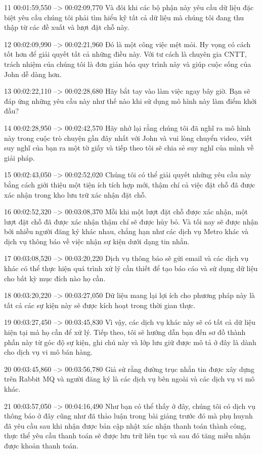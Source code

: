 11
00:01:59,550 --> 00:02:09,770
Và đôi khi các bộ phận này yêu cầu dữ liệu đặc biệt yêu cầu chúng tôi phải tìm hiểu kỹ tất cả dữ liệu mà chúng tôi đang thu thập từ các đề xuất và lượt đặt chỗ này.

12
00:02:09,990 --> 00:02:21,960
Đó là một công việc mệt mỏi.  Hy vọng có cách tốt hơn để giải quyết tất cả những điều này.  Với tư cách là chuyên gia CNTT, trách nhiệm của chúng tôi là đơn giản hóa quy trình này và giúp cuộc sống của John dễ dàng hơn.

13
00:02:22,110 --> 00:02:28,680
Hãy bắt tay vào làm việc ngay bây giờ.  Bạn sẽ đáp ứng những yêu cầu này như thế nào khi sử dụng mô hình này làm điểm khởi đầu?

14
00:02:28,950 --> 00:02:42,570
Hãy nhớ lại rằng chúng tôi đã nghĩ ra mô hình này trong cuộc trò chuyện gần đây nhất với John và vui lòng chuyển video, viết suy nghĩ của bạn ra một tờ giấy và tiếp theo tôi sẽ chia sẻ suy nghĩ của mình về giải pháp.

15
00:02:43,050 --> 00:02:52,020
Chúng tôi có thể giải quyết những yêu cầu này bằng cách giới thiệu một tiện ích tích hợp mới, thậm chí cả việc đặt chỗ đã được xác nhận trong kho lưu trữ xác nhận đặt chỗ.

16
00:02:52,320 --> 00:03:08,370
Mỗi khi một lượt đặt chỗ được xác nhận, một lượt đặt chỗ đã được xác nhận thậm chí sẽ được hủy bỏ.  Và tối nay sẽ được nhận bởi nhiều người đăng ký khác nhau, chẳng hạn như các dịch vụ Metro khác và dịch vụ thông báo về việc nhận sự kiện dưới dạng tin nhắn.

17
00:03:08,520 --> 00:03:20,220
Dịch vụ thông báo sẽ gửi email và các dịch vụ khác có thể thực hiện quá trình xử lý cần thiết để tạo báo cáo và sử dụng dữ liệu cho bất kỳ mục đích nào họ cần.

18
00:03:20,220 --> 00:03:27,050
Dữ liệu mang lại lợi ích cho phương pháp này là tất cả các sự kiện này sẽ được kích hoạt trong thời gian thực.

19
00:03:27,450 --> 00:03:45,830
Vì vậy, các dịch vụ khác này sẽ có tất cả dữ liệu hiện tại mà họ cần để xử lý.  Tiếp theo, tôi sẽ hướng dẫn bạn đến sơ đồ thành phần này từ góc độ sự kiện, ghi chú này và lớp lưu giữ được mô tả ở đây là dành cho dịch vụ vi mô bán hàng.

20
00:03:45,860 --> 00:03:56,780
Giả sử rằng đường trục nhắn tin được xây dựng trên Rabbit MQ và người đăng ký là các dịch vụ bên ngoài và các dịch vụ vi mô khác.

21
00:03:57,050 --> 00:04:16,490
Như bạn có thể thấy ở đây, chúng tôi có dịch vụ thông báo ở đây cũng như đã thảo luận trong bài giảng trước đó mà phụ huynh đã yêu cầu sau khi nhận được bản cập nhật xác nhận thanh toán thành công, thực thể yêu cầu thanh toán sẽ được lưu trữ liên tục và sau đó tăng miền nhận được khoản thanh toán.

